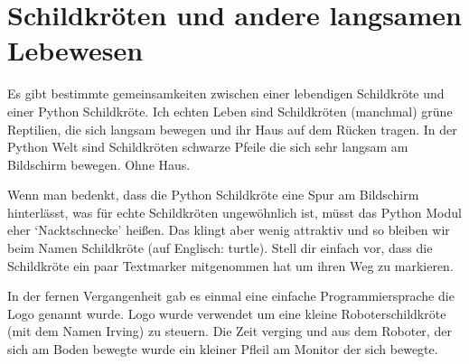 

\chapter{Schildkröten und andere langsamen Lebewesen}\label{ch:turtles}

Es gibt bestimmte gemeinsamkeiten zwischen einer lebendigen Schildkröte und einer Python Schildkröte. Ich echten Leben sind Schildkröten (manchmal) grüne Reptilien, die sich langsam bewegen und ihr Haus auf dem Rücken tragen. In der Python Welt sind Schildkröten schwarze Pfeile die sich sehr langsam am Bildschirm bewegen. Ohne Haus.

Wenn man bedenkt, dass die Python Schildkröte eine Spur am Bildschirm hinterlässt, was für echte Schildkröten ungewöhnlich ist, müsst das Python Modul eher `Nacktschnecke' heißen. Das klingt aber wenig attraktiv und so bleiben wir beim Namen Schildkröte (auf Englisch: turtle). Stell dir einfach vor, dass die Schildkröte ein paar Textmarker mitgenommen hat um ihren Weg zu markieren. 

In der fernen Vergangenheit gab es einmal eine einfache Programmiersprache die Logo genannt wurde. Logo wurde verwendet um eine kleine Roboterschildkröte (mit dem Namen Irving) zu steuern. Die Zeit verging und aus dem Roboter, der sich am Boden bewegte wurde ein kleiner Pfleil am Monitor der sich bewegte.

